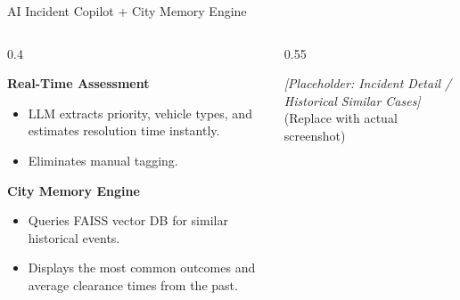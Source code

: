 \documentclass[aspectratio=169, xcolor=table]{beamer}
\newcommand{\demoPlaceholder}[2]{
    \begin{tcolorbox}[colback=SentinelSurfaceRaised, colframe=SentinelSurfaceRaised, arc=4mm, height=#1, valign=center, halign=center]
        \textcolor{SentinelTextSec}{\Large \textit{[Placeholder: #2]}} \\
        \vspace{2mm}
        \textcolor{SentinelTextSec}{\small (Replace with actual screenshot)}
    \end{tcolorbox}
}
\begin{document}
\begin{frame}{AI Incident Copilot + City Memory Engine}
    \begin{columns}[T]
        \begin{column}{0.4\textwidth}
            \begin{tcolorbox}[sentinelcard]
                \textbf{Real-Time Assessment}
                \begin{itemize}
                    \item LLM extracts priority, vehicle types, and estimates resolution time instantly.
                    \item Eliminates manual tagging.
                \end{itemize}
            \end{tcolorbox}
            \begin{tcolorbox}[sentinelcard]
                \textbf{City Memory Engine}
                \begin{itemize}
                    \item Queries FAISS vector DB for similar historical events.
                    \item Displays the most common outcomes and average clearance times from the past.
                \end{itemize}
            \end{tcolorbox}
        \end{column}
        
        \begin{column}{0.55\textwidth}
            \demoPlaceholder{6.5cm}{Incident Detail / Historical Similar Cases}
        \end{column}
    \end{columns}
\end{frame}
\end{document}
